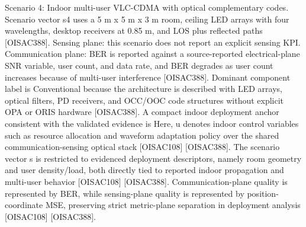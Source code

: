 {}Scenario 4: Indoor multi-user VLC-CDMA with optical complementary codes.\markdownRendererHardLineBreak
{}Scenario vector s4 uses a 5 m x 5 m x 3 m room, ceiling LED arrays with four wavelengths, desktop receivers at 0.85 m, and LOS plus reflected paths [O\markdownRendererUnderscore{}ISAC\markdownRendererUnderscore{}388]. Sensing plane: this scenario does not report an explicit sensing KPI. Communication plane: BER is reported against a source-reported electrical-plane SNR variable, user count, and data rate, and BER degrades as user count increases because of multi-user interference [O\markdownRendererUnderscore{}ISAC\markdownRendererUnderscore{}388]. Dominant component label is Conventional because the architecture is described with LED arrays, optical filters, PD receivers, and OCC/OOC code structures without explicit OPA or ORIS hardware [O\markdownRendererUnderscore{}ISAC\markdownRendererUnderscore{}388].\markdownRendererInterblockSeparator
{}
\markdownRendererSectionEnd \markdownRendererSectionBegin
{}\markdownRendererInterblockSeparator
{}A compact indoor deployment anchor consistent with the validated evidence is\markdownRendererInterblockSeparator
{}\markdownRendererInterblockSeparator
{}\markdownRendererInterblockSeparator
{}Here, u denotes indoor control variables such as resource allocation and waveform adaptation policy over the shared communication-sensing optical stack [O\markdownRendererUnderscore{}ISAC\markdownRendererUnderscore{}108] [O\markdownRendererUnderscore{}ISAC\markdownRendererUnderscore{}388]. The scenario vector s is restricted to evidenced deployment descriptors, namely room geometry and user density/load, both directly tied to reported indoor propagation and multi-user behavior [O\markdownRendererUnderscore{}ISAC\markdownRendererUnderscore{}108] [O\markdownRendererUnderscore{}ISAC\markdownRendererUnderscore{}388]. Communication-plane quality is represented by BER, while sensing-plane quality is represented by position-coordinate MSE, preserving strict metric-plane separation in deployment analysis [O\markdownRendererUnderscore{}ISAC\markdownRendererUnderscore{}108] [O\markdownRendererUnderscore{}ISAC\markdownRendererUnderscore{}388].\markdownRendererParagraphSeparator
{}\markdownRendererInterblockSeparator
